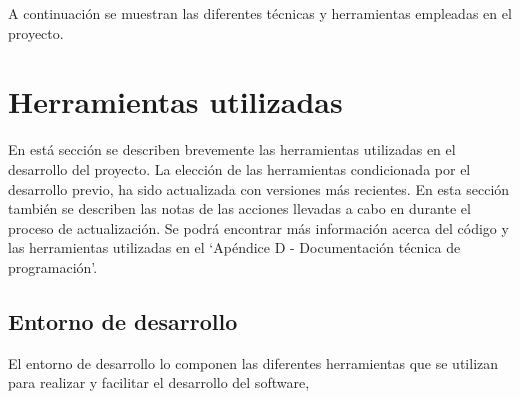 
A continuación se muestran las diferentes técnicas y herramientas empleadas en el proyecto.

\section{Herramientas utilizadas}

En está sección se describen brevemente las herramientas utilizadas en el desarrollo del proyecto. La elección de las herramientas condicionada por el desarrollo previo, ha sido actualizada con versiones más recientes. En esta sección también se describen las notas de las acciones llevadas a cabo en durante el proceso de actualización. 
Se podrá encontrar más información acerca del código y las herramientas utilizadas en el 
`Apéndice D - Documentación técnica de programación'.


\subsection{Entorno de desarrollo}\label{sect:4_1_1_HerramientasDesarrollo}
El entorno de desarrollo lo componen las diferentes herramientas que se utilizan para realizar y facilitar el desarrollo del software,

